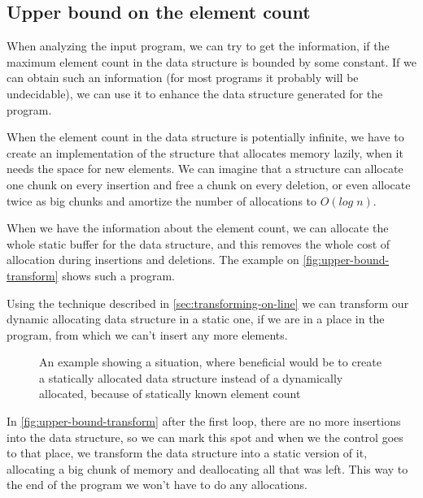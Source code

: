 \documentclass[a4paper,11pt]{article}
\begin{document}
            
	\subsection{Upper bound on the element count}

		When analyzing the input program, we can try to get the information, if the maximum element count in the
		data structure is bounded by some constant. If we can obtain such an information (for most programs it
		probably will be undecidable), we can use it to enhance the data structure generated for the program.

		When the element count in the data structure is potentially infinite, we have to create an
		implementation of the structure that allocates memory lazily, when it needs the space for new elements.
		We can imagine that a structure can allocate one chunk on every insertion and free a chunk on every
		deletion, or even allocate twice as big chunks and amortize the number of allocations to $O(log \; n)$.

		When we have the information about the element count, we can allocate the whole static buffer for the
		data structure, and this removes the whole cost of allocation during insertions and deletions. The
		example on \autoref{fig:upper-bound-transform} shows such a program.

		Using the technique described in \autoref{sec:transforming-on-line} we can transform our dynamic
		allocating data structure in a static one, if we are in a place in the program, from which we can't
		insert any more elements. 

		\begin{figure}
			

			\caption{An example showing a situation, where beneficial would be to create a statically allocated data
			structure instead of a dynamically allocated, because of statically known element count}

			\label{fig:upper-bound-transform}
		\end{figure}

		In \autoref{fig:upper-bound-transform} after the first loop, there are no more insertions into the data
		structure, so we can mark this spot and when we the control goes to that place, we transform the data
		structure into a static version of it, allocating a big chunk of memory and deallocating all that was
		left. This way to the end of the program we won't have to do any allocations.
\end{document}
